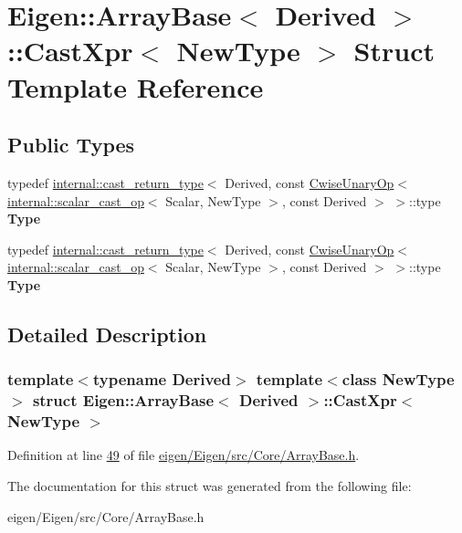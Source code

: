\hypertarget{struct_eigen_1_1_array_base_1_1_cast_xpr}{}\section{Eigen\+:\+:Array\+Base$<$ Derived $>$\+:\+:Cast\+Xpr$<$ New\+Type $>$ Struct Template Reference}
\label{struct_eigen_1_1_array_base_1_1_cast_xpr}
\subsection*{Public Types}
\begin{DoxyCompactItemize}
\item 
\mbox{\label{struct_eigen_1_1_array_base_1_1_cast_xpr_a909bc162c4bf7829a0f0e01185fdf15b}} 
typedef \hyperlink{struct_eigen_1_1internal_1_1cast__return__type}{internal\+::cast\+\_\+return\+\_\+type}$<$ Derived, const \hyperlink{group___core___module_class_eigen_1_1_cwise_unary_op}{Cwise\+Unary\+Op}$<$ \hyperlink{struct_eigen_1_1internal_1_1scalar__cast__op}{internal\+::scalar\+\_\+cast\+\_\+op}$<$ Scalar, New\+Type $>$, const Derived $>$ $>$\+::type {\bfseries Type}
\item 
\mbox{\label{struct_eigen_1_1_array_base_1_1_cast_xpr_a909bc162c4bf7829a0f0e01185fdf15b}} 
typedef \hyperlink{struct_eigen_1_1internal_1_1cast__return__type}{internal\+::cast\+\_\+return\+\_\+type}$<$ Derived, const \hyperlink{group___core___module_class_eigen_1_1_cwise_unary_op}{Cwise\+Unary\+Op}$<$ \hyperlink{struct_eigen_1_1internal_1_1scalar__cast__op}{internal\+::scalar\+\_\+cast\+\_\+op}$<$ Scalar, New\+Type $>$, const Derived $>$ $>$\+::type {\bfseries Type}
\end{DoxyCompactItemize}


\subsection{Detailed Description}
\subsubsection*{template$<$typename Derived$>$\newline
template$<$class New\+Type$>$\newline
struct Eigen\+::\+Array\+Base$<$ Derived $>$\+::\+Cast\+Xpr$<$ New\+Type $>$}



Definition at line \hyperlink{eigen_2_eigen_2src_2_core_2_array_base_8h_source_l00049}{49} of file \hyperlink{eigen_2_eigen_2src_2_core_2_array_base_8h_source}{eigen/\+Eigen/src/\+Core/\+Array\+Base.\+h}.



The documentation for this struct was generated from the following file\+:\begin{DoxyCompactItemize}
\item 
eigen/\+Eigen/src/\+Core/\+Array\+Base.\+h\end{DoxyCompactItemize}
